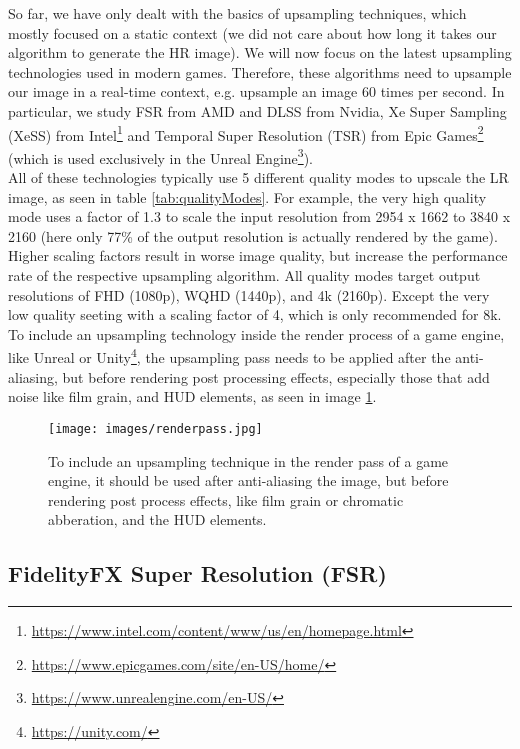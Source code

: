 \documentclass[letterpaper, 10 pt, conference]{ieeeconf}  %
\begin{document}
So far, we have only dealt with the basics of upsampling techniques, which mostly focused on a static context (we did not care about how long it takes our algorithm to generate the HR image).
We will now focus on the latest upsampling technologies used in modern games. Therefore, these algorithms need to upsample our image in a real-time context, e.g. upsample an image 60 times per second.
In particular, we study FSR from AMD and DLSS from Nvidia, 
Xe Super Sampling (XeSS) \cite{XeSS_intro} from Intel\footnote{\url{https://www.intel.com/content/www/us/en/homepage.html}} 
and Temporal Super Resolution (TSR) \cite{TSR_intro} from Epic Games\footnote{\url{https://www.epicgames.com/site/en-US/home/}} (which is used exclusively in the Unreal Engine\footnote{\url{https://www.unrealengine.com/en-US/}}). \\
All of these technologies typically use 5 different quality modes to upscale the LR image, as seen in table \ref{tab:qualityModes}. 
For example, the very high quality mode uses a factor of 1.3 to scale the input resolution from 2954 x 1662 to 3840 x 2160 (here only 77\% of the output resolution is actually rendered by the game).
Higher scaling factors result in worse image quality, but increase the performance rate of the respective upsampling algorithm.
All quality modes target output resolutions of FHD (1080p), WQHD (1440p), and 4k (2160p).
Except the very low quality seeting with a scaling factor of 4, which is only recommended for 8k.
To include an upsampling technology inside the render process of a game engine, like Unreal or Unity\footnote{\url{https://unity.com/}}, 
the upsampling pass needs to be applied after the anti-aliasing, but before rendering post processing effects, especially those that add noise like film grain, and HUD elements, as seen in image \ref{fig:renderpass}.

\begin{figure}[!ht]
    \caption{To include an upsampling technique in the render pass of a game engine, 
    it should be used after anti-aliasing the image, but before rendering post process effects, 
    like film grain or chromatic abberation, and the HUD elements.}
    \centering
    \texttt{[image: images/renderpass.jpg]}
    \label{fig:renderpass}
\end{figure}

\subsection{FidelityFX Super Resolution (FSR)}
\end{document}
